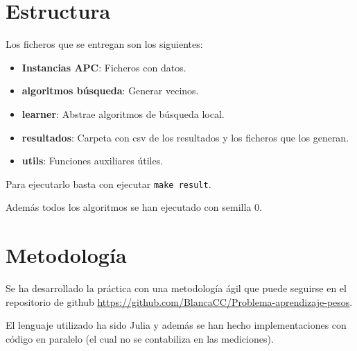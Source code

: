 
\section{Estructura }

Los ficheros que se entregan son los siguientes: 
\begin{itemize}
    \item \textbf{Instancias APC}: Ficheros con datos.
    \item \textbf{algoritmos búsqueda}: Generar vecinos. 
    \item \textbf{learner}: Abstrae algoritmos de búsqueda local.
    \item \textbf{resultados}: Carpeta con csv de los resultados y los ficheros que los generan.
    \item \textbf{utils}: Funciones auxiliares útiles.
\end{itemize}

Para ejecutarlo basta con ejecutar \texttt{make result}.

Además todos los algoritmos se han ejecutado con semilla $0$. 

\section{Metodología}  

Se ha desarrollado la práctica con una metodología ágil que puede seguirse 
en el repositorio de github \url{https://github.com/BlancaCC/Problema-aprendizaje-pesos}.

El lenguaje utilizado ha sido Julia y además se han hecho implementaciones con código en paralelo 
(el cual no se contabiliza en las mediciones).
